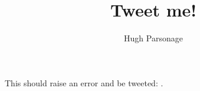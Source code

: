 \documentclass{grattan}
\author{Hugh Parsonage}
\title{Tweet me!}
\begin{document}
This should raise an error and be tweeted: \cite[3]{Knuth}.
\end{document}
